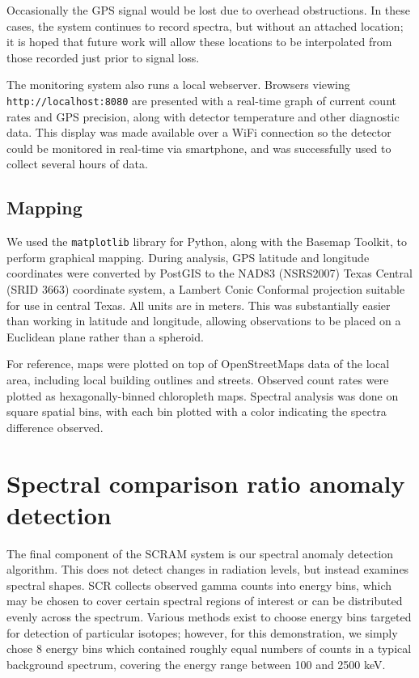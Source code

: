 Occasionally the GPS signal would be lost due to overhead obstructions. In these
cases, the system continues to record spectra, but without an attached location;
it is hoped that future work will allow these locations to be interpolated from
those recorded just prior to signal loss.

The monitoring system also runs a local webserver. Browsers viewing
\texttt{http://localhost:8080} are presented with a real-time graph of current
count rates and GPS precision, along with detector temperature and other
diagnostic data. This display was made available over a WiFi connection so the
detector could be monitored in real-time via smartphone, and was successfully
used to collect several hours of data.

\subsection{Mapping}

We used the \texttt{matplotlib}\cite{Hunter:2007} library for Python, along with
the Basemap Toolkit, to perform graphical mapping. During analysis, GPS latitude
and longitude coordinates were converted by PostGIS to the NAD83 (NSRS2007)
Texas Central (SRID 3663) coordinate system, a Lambert Conic Conformal
projection suitable for use in central Texas.\cite{nad83} All units are in
meters. This was substantially easier than working in latitude and longitude,
allowing observations to be placed on a Euclidean plane rather than a spheroid.

For reference, maps were plotted on top of OpenStreetMaps data of the local
area, including local building outlines and streets.\cite{osm} Observed count
rates were plotted as hexagonally-binned chloropleth maps. Spectral analysis was
done on square spatial bins, with each bin plotted with a color indicating the
spectra difference observed.

\section{Spectral comparison ratio anomaly detection}

The final component of the SCRAM system is our spectral anomaly detection
algorithm. This does not detect changes in radiation levels, but instead
examines spectral shapes. SCR collects observed gamma counts into energy bins,
which may be chosen to cover certain spectral regions of interest or can be
distributed evenly across the spectrum. Various methods exist to choose energy
bins targeted for detection of particular
isotopes;\cite{Wei:2010go,Pfund:2010hm} however, for this demonstration, we
simply chose 8 energy bins which contained roughly equal numbers of counts in a
typical background spectrum, covering the energy range between 100 and 2500 keV.


